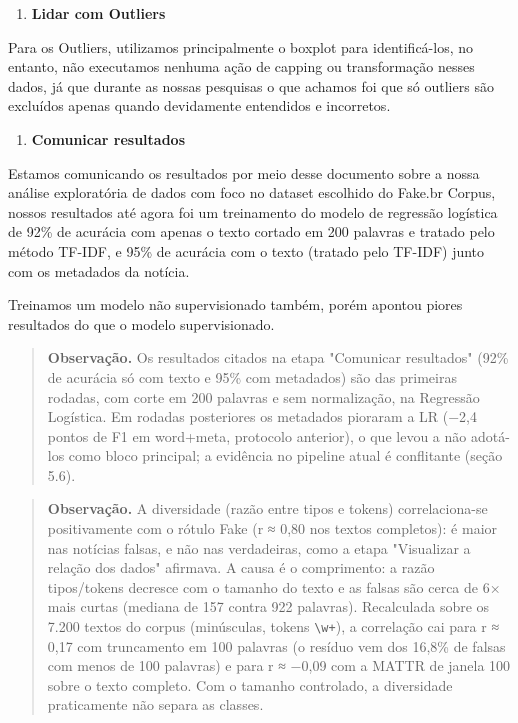 \documentclass[
  brazilian,
  11pt,
]{article}
\providecommand{\tightlist}{%
  \setlength{\itemsep}{0pt}\setlength{\parskip}{0pt}}
\begin{document}
\begin{enumerate}
\def\labelenumi{\arabic{enumi}.}
\tightlist
\setcounter{enumi}{6}
\item
  \textbf{Lidar com Outliers}
\end{enumerate}

Para os Outliers, utilizamos principalmente o boxplot para identificá-los, no entanto, não executamos nenhuma ação de capping ou transformação nesses dados, já que durante as nossas pesquisas o que achamos foi que só outliers são excluídos apenas quando devidamente entendidos e incorretos.

\begin{enumerate}
\def\labelenumi{\arabic{enumi}.}
\tightlist
\setcounter{enumi}{7}
\item
  \textbf{Comunicar resultados}
\end{enumerate}

Estamos comunicando os resultados por meio desse documento sobre a nossa análise exploratória de dados com foco no dataset escolhido do Fake.br Corpus, nossos resultados até agora foi um treinamento do modelo de regressão logística de 92\% de acurácia com apenas o texto cortado em 200 palavras e tratado pelo método TF-IDF, e 95\% de acurácia com o texto (tratado pelo TF-IDF) junto com os metadados da notícia.

Treinamos um modelo não supervisionado também, porém apontou piores resultados do que o modelo supervisionado.

\begin{quote}
\textbf{Observação.} Os resultados citados na etapa "Comunicar resultados" (92\% de acurácia só com texto e 95\% com metadados) são das primeiras rodadas, com corte em 200 palavras e sem normalização, na Regressão Logística. Em rodadas posteriores os metadados pioraram a LR (−2,4 pontos de F1 em word+meta, protocolo anterior), o que levou a não adotá-los como bloco principal; a evidência no pipeline atual é conflitante (seção 5.6).
\end{quote}

\begin{quote}
\textbf{Observação.} A diversidade (razão entre tipos e tokens) correlaciona-se positivamente com o rótulo Fake (r ≈ 0,80 nos textos completos): é maior nas notícias falsas, e não nas verdadeiras, como a etapa "Visualizar a relação dos dados" afirmava. A causa é o comprimento: a razão tipos/tokens decresce com o tamanho do texto e as falsas são cerca de 6× mais curtas (mediana de 157 contra 922 palavras). Recalculada sobre os 7.200 textos do corpus (minúsculas, tokens \texttt{\textbackslash w+}), a correlação cai para r ≈ 0,17 com truncamento em 100 palavras (o resíduo vem dos 16,8\% de falsas com menos de 100 palavras) e para r ≈ −0,09 com a MATTR de janela 100 sobre o texto completo. Com o tamanho controlado, a diversidade praticamente não separa as classes.
\end{quote}
\end{document}

